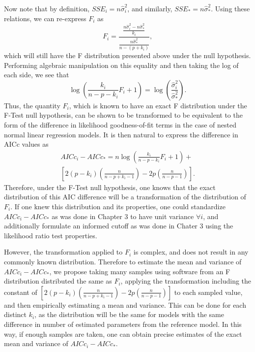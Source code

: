 Now note that by definition, $SSE_i = n \hat{\sigma}^2_i$, and similarly, $SSE_* = n \hat{\sigma}^2_*$. Using these relations, we can re-express
$F_i$ as
\begin{equation}
	F_i = \frac{\frac{n \hat{\sigma}^2_i - n \hat{\sigma}^2_*}{k_i}}{\frac{n \hat{\sigma}^2_*}{n-(p+k_i)}} ,
\end{equation}
which will still have the F distribution presented above under the null hypothesis. Performing algebraic manipulation on this equality and
then taking the log of each side, we see that
\begin{equation}
	\log \left( \frac{k_i}{n-p-k_i} F_i + 1 \right) = \log \left( \frac{\hat{\sigma}^2_i}{\hat{\sigma}^2_*} \right) .
\end{equation}
Thus, the quantity $F_i$, which is known to have an exact F distribution under the F-Test null hypothesis, can be shown to be transformed to
be equivalent to the form of the difference in likelihood goodness-of-fit terms in the case of nested normal linear regression models.
It is then natural to express the difference in AICc values as
\begin{equation}
	\begin{split}
	AICc_i - AICc_* = n \log \left( \frac{k_i}{n-p-k_i} F_i + 1 \right) + \\
	\left[ 2(p-k_i) \left( \frac{n}{n-p+k_i-1} \right) - 2p \left( \frac{n}{n-p-1} \right) \right] .
	\end{split}
\end{equation}
Therefore, under the F-Test null hypothesis, one knows that the exact distribution of this AIC difference will be a transformation of the
distribution of $F_i$. If one knew this distribution and its properties, one could standardize $AICc_i - AICc_*$ as was done in Chapter 3
to have unit variance $\forall i$, and additionally formulate an informed cutoff as was done in Chater 3 using the likelihood ratio
test properties.

However, the transformation applied to $F_i$ is complex, and does not result in any commonly known distribution. Therefore to estimate
the mean and variance of $AICc_i - AICc_*$, we propose taking many samples using software from an F distribution distributed the same as $F_i$,
applying the transformation including the constant of $\left[ 2(p-k_i) \left( \frac{n}{n-p+k_i-1} \right) - 2p \left( \frac{n}{n-p-1} \right) \right]$ to each sampled value,
and then empirically estimating a mean and variance. This can be done for each distinct $k_i$, as the distribution will be the same for models with
the same difference in number of estimated parameters from the reference model. In this way, if enough samples are taken, one can obtain precise estimates
of the exact mean and variance of $AICc_i - AICc_*$.

